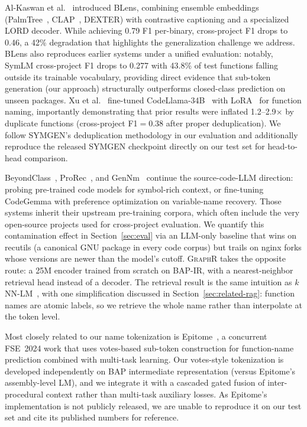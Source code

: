 \documentclass[sigconf,nonacm]{acmart}
\newcommand{\sysname}{\textsc{GraphR}}
\begin{document}
Al-Kaswan et al.~\cite{blens} introduced BLens, combining ensemble embeddings (PalmTree~\cite{palmtree}, CLAP~\cite{clap}, DEXTER) with contrastive captioning and a specialized LORD decoder. While achieving 0.79 F1 per-binary, cross-project F1 drops to 0.46, a 42\% degradation that highlights the generalization challenge we address. BLens also reproduces earlier systems under a unified evaluation: notably, SymLM cross-project F1 drops to 0.277 with 43.8\% of test functions falling outside its trainable vocabulary, providing direct evidence that sub-token generation (our approach) structurally outperforms closed-class prediction on unseen packages. Xu et al.~\cite{symgen} fine-tuned CodeLlama-34B~\cite{codellama} with LoRA~\cite{lora} for function naming, importantly demonstrating that prior results were inflated 1.2--2.9$\times$ by duplicate functions (cross-project F1$=$0.38 after proper deduplication). We follow SYMGEN's deduplication methodology in our evaluation and additionally reproduce the released SYMGEN checkpoint directly on our test set for head-to-head comparison.

BeyondClass~\cite{beyondclass}, ProRec~\cite{prorec}, and GenNm~\cite{gennm} continue the source-code-LLM direction: probing pre-trained code models for symbol-rich context, or fine-tuning CodeGemma with preference optimization on variable-name recovery. Those systems inherit their upstream pre-training corpora, which often include the very open-source projects used for cross-project evaluation. We quantify this contamination effect in Section~\ref{sec:eval} via an LLM-only baseline that wins on recutils (a canonical GNU package in every code corpus) but trails on nginx forks whose versions are newer than the model's cutoff. \sysname{} takes the opposite route: a 25M encoder trained from scratch on BAP-IR, with a nearest-neighbor retrieval head instead of a decoder. The retrieval result is the same intuition as $k$NN-LM~\cite{knnlm,knnmt}, with one simplification discussed in Section~\ref{sec:related-rag}: function names are atomic labels, so we retrieve the whole name rather than interpolate at the token level.

Most closely related to our name tokenization is Epitome~\cite{epitome}, a concurrent FSE~2024 work that uses votes-based sub-token construction for function-name prediction combined with multi-task learning. Our votes-style tokenization is developed independently on BAP intermediate representation (versus Epitome's assembly-level LM), and we integrate it with a cascaded gated fusion of inter-procedural context rather than multi-task auxiliary losses. As Epitome's implementation is not publicly released, we are unable to reproduce it on our test set and cite its published numbers for reference.
\end{document}

